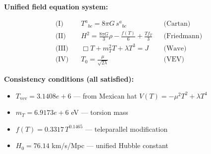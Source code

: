 
\textbf{Unified field equation system:}

\begin{align}
  \text{(I)} \quad & T^a{}_{bc} = 8\pi G \, s^a{}_{bc} && \text{(Cartan)} \\
  \text{(II)} \quad & H^2 = \frac{8\pi G}{3}\rho - \frac{f(T)}{6} + \frac{Tf_T}{3} && \text{(Friedmann)} \\
  \text{(III)} \quad & \Box T + m_T^2 T + \lambda T^3 = J && \text{(Wave)} \\
  \text{(IV)} \quad & T_0 = \frac{\mu}{\sqrt{2\lambda}} && \text{(VEV)}
\end{align}

\textbf{Consistency conditions (all satisfied):}
\begin{itemize}
  \item $T_{\text{vev}} = 3.1408e+6$ — from Mexican hat $V(T) = -\mu^2 T^2 + \lambda T^4$
  \item $m_T = 6.9173e+6$ eV — torsion mass
  \item $f(T) = 0.3317 \, T^{0.1465}$ — teleparallel modification
  \item $H_0 = 76.14$ km/s/Mpc — unified Hubble constant
\end{itemize}